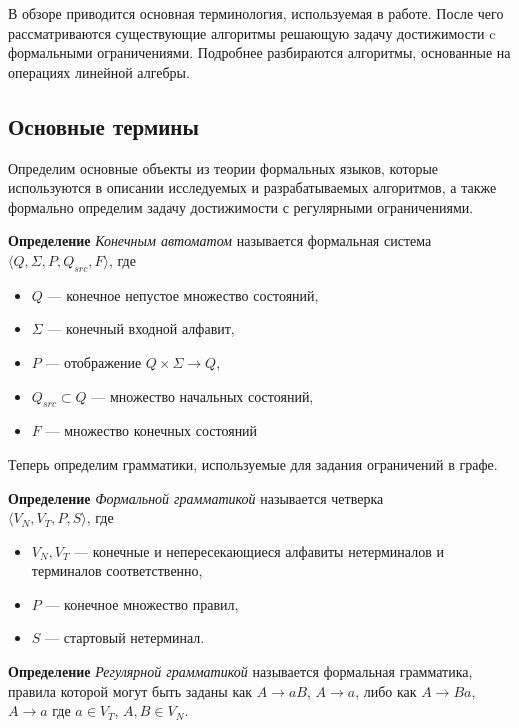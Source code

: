 
\label{sec:relatedworks}
В обзоре приводится основная терминология, используемая в работе. После чего рассматриваются существующие алгоритмы решающую задачу достижимости c формальными ограничениями. Подробнее разбираются алгоритмы, основанные на операциях линейной алгебры.

\subsection{Основные термины}

Определим основные объекты из теории формальных языков, которые используются в описании исследуемых и разрабатываемых алгоритмов, а также формально определим задачу достижимости с регулярными ограничениями.

\noindent\textbf{Определение}  \textit{Конечным автоматом} называется формальная система $\langle Q, \Sigma, P, Q_{src}, F \rangle$, где 
\begin{itemize}
    \item $Q$ --- конечное непустое множество состояний,
    \item $\Sigma$ --- конечный входной алфавит,
    \item $P$ --- отображение $Q \times \Sigma \rightarrow Q$,
    \item $Q_{src} \subset Q$ --- множество начальных состояний,
    \item $F$ --- множество конечных состояний
\end{itemize}

Теперь определим грамматики, используемые для задания ограничений в графе.

\noindent\textbf{Определение} \textit{Формальной грамматикой} называется четверка \\ $\langle V_N, V_T, P, S \rangle$, где
\begin{itemize}
    \item $V_N, V_T$ --- конечные и непересекающиеся алфавиты нетерминалов и терминалов соответственно, 
    \item $P$ --- конечное множество правил,
    \item $S$ --- стартовый нетерминал.
\end{itemize}

\noindent\textbf{Определение} \textit{Регулярной грамматикой} называется формальная грамматика, правила которой могут быть заданы как $A \rightarrow aB$, $A \rightarrow a$, либо как $A \rightarrow Ba$, $A \rightarrow a$ где $a \in V_T$, $A,B \in V_N$.

